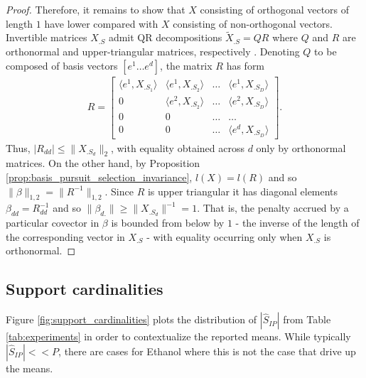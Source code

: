\begin{proof}
Therefore, it remains to show that $X$ consisting of orthogonal vectors of length $1$ have lower compared with $X$ consisting of non-orthogonal vectors.
Invertible matrices $X_{.S}$ admit QR decompositions $\tilde X_{.S} = QR$ where $Q$ and $R$ are orthonormal and upper-triangular matrices, respectively \citep{Anderson1992-fb}.
Denoting $Q$ to be composed of basis vectors $[e^1 \dots e^d]$, the matrix $R$ has form
\begin{align}
R = \begin{bmatrix}
\langle e^1, X_{.S_1} \rangle & \langle e^1,  X_{.S_2} \rangle  &\dots &  \langle e^1,  X_{.S_D} \rangle \\
0 & \langle e^2,  X_{.S_2} \rangle & \dots  &  \langle e^2,  X_{.S_D} \rangle\\
0 & 0 & \dots & \dots  \\
0 & 0 & \dots & \langle e^d, X_{.S_D} \rangle 
\end{bmatrix}.
\end{align}
Thus, $|R_{dd} | \leq \|X_{.{S_{d}}}\|_2$, with equality obtained across $d$ only by orthonormal matrices.
On the other hand, by Proposition \ref{prop:basis_pursuit_selection_invariance}, $l(X) = l(R)$ and so $\|\beta\|_{1,2} = \|R^{-1}\|_{1,2}$.
Since $R$ is upper triangular it has diagonal elements $\beta_{dd} = R_{dd}^{-1}$ and so $\|\beta_{d.}\| \geq \| X_{.{S_d}}\|^{-1} = 1$.
That is, the penalty accrued by a particular covector in $\beta$ is bounded from below by $1$ - the inverse of the length of the corresponding vector in $X_{.S}$ - with equality occurring only when $X_{.S}$ is orthonormal.
\end{proof}

\newpage

\subsection{Support cardinalities}
\label{sec:support_cardinalities}

Figure \ref{fig:support_cardinalities} plots the distribution of $|\widehat{S}_{IP}|$ from Table \ref{tab:experiments} in order to contextualize the reported means.
While typically $|\widehat{S}_{IP}| << P$, there are cases for Ethanol where this is not the case that drive up the means.

